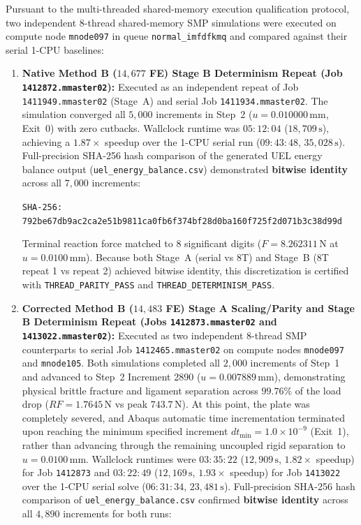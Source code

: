 Pursuant to the multi-threaded shared-memory execution qualification protocol, two independent 8-thread shared-memory SMP simulations were executed on compute node \texttt{mnode097} in queue \texttt{normal\_imfdfkmq} and compared against their serial 1-CPU baselines:
\begin{enumerate}
  \item \textbf{Native Method B ($14{,}677$ FE) Stage B Determinism Repeat (Job \texttt{1412872.mmaster02}):} Executed as an independent repeat of Job \texttt{1411949.mmaster02} (Stage~A) and serial Job \texttt{1411934.mmaster02}. The simulation converged all $5{,}000$ increments in Step~2 ($u = 0.010000\,\mathrm{mm}$, Exit~0) with zero cutbacks. Wallclock runtime was $05:12:04$ ($18{,}709\,\mathrm{s}$), achieving a $1.87\times$ speedup over the 1-CPU serial run ($09:43:48$, $35{,}028\,\mathrm{s}$). Full-precision SHA-256 hash comparison of the generated UEL energy balance output (\texttt{uel\_energy\_balance.csv}) demonstrated \textbf{bitwise identity} across all $7{,}000$ increments:
  \begin{center}
    \texttt{SHA-256: 792be67db9ac2ca2e51b9811ca0fb6f374bf28d0ba160f725f2d071b3c38d99d}
  \end{center}
  Terminal reaction force matched to 8 significant digits ($F = 8.262311\,\mathrm{N}$ at $u = 0.0100\,\mathrm{mm}$). Because both Stage~A (serial vs 8T) and Stage~B (8T repeat 1 vs repeat 2) achieved bitwise identity, this discretization is certified with \texttt{THREAD\_PARITY\_PASS} and \texttt{THREAD\_DETERMINISM\_PASS}.
  \item \textbf{Corrected Method B ($14{,}483$ FE) Stage A Scaling/Parity and Stage B Determinism Repeat (Jobs \texttt{1412873.mmaster02} and \texttt{1413022.mmaster02}):} Executed as two independent 8-thread SMP counterparts to serial Job \texttt{1412465.mmaster02} on compute nodes \texttt{mnode097} and \texttt{mnode105}. Both simulations completed all $2{,}000$ increments of Step~1 and advanced to Step~2 Increment 2890 ($u = 0.007889\,\mathrm{mm}$), demonstrating physical brittle fracture and ligament separation across $99.76\%$ of the load drop ($RF = 1.7645\,\mathrm{N}$ vs peak $743.7\,\mathrm{N}$). At this point, the plate was completely severed, and Abaqus automatic time incrementation terminated upon reaching the minimum specified increment $dt_{\min} = 1.0\times 10^{-9}$ (Exit~1), rather than advancing through the remaining uncoupled rigid separation to $u = 0.0100\,\mathrm{mm}$. Wallclock runtimes were $03:35:22$ ($12{,}909\,\mathrm{s}$, $1.82\times$ speedup) for Job \texttt{1412873} and $03:22:49$ ($12{,}169\,\mathrm{s}$, $1.93\times$ speedup) for Job \texttt{1413022} over the 1-CPU serial solve ($06:31:34$, $23{,}481\,\mathrm{s}$). Full-precision SHA-256 hash comparison of \texttt{uel\_energy\_balance.csv} confirmed \textbf{bitwise identity} across all $4{,}890$ increments for both runs:

\end{enumerate}
